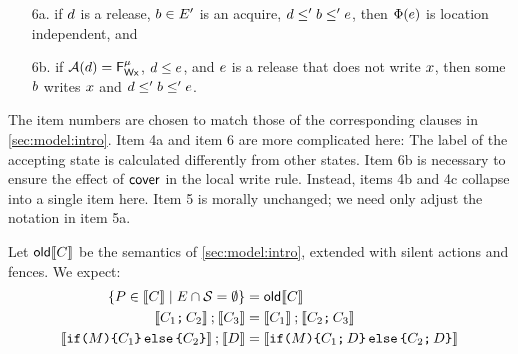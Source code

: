 \begin{definition}
\begin{enumerate}
\item[6a.] if $\bEv$ is a release, $\dEv\in\Event'$ is an acquire,
  $\bEv\le'\dEv\le'\aEv$, then $\labelingForm(\aEv)$ is location independent, and
\item[6b.] if $\labelingAct(\bEv)=\DFW[\aLoc]{\amode}$, $\bEv\le\aEv$, and
  $\aEv$ is a release that does not write $\aLoc$, then  some
  $\dEv$ writes $\aLoc$ and $\bEv\le'\dEv\le'\aEv$. %
\end{enumerate}
\end{definition}

The item numbers are chosen to match those of the corresponding clauses in
\textsection\ref{sec:model:intro}.  Item 4a and item 6 are more complicated
here: The label of the accepting state is calculated differently from other
states. Item 6b is necessary to ensure the effect of $\relfilt{}$ in the
local write rule.  Instead, items 4b and 4c collapse into a single item here.
Item 5 is morally unchanged; we need only adjust the notation in item 5a.

Let $\semold{\aCmd}$ be the semantics of \textsection\ref{sec:model:intro},
extended with silent actions and fences.  We expect:
\begin{align*}
  \{ \aPS\in\sem{\aCmd} \mid \disjoint{\Event}{\Sub}\} &= \semold{\aCmd}
  \\
  \sem{\aCmd_1\SEMI\aCmd_2}\sequence\sem{\aCmd_3} &= \sem{\aCmd_1}\sequence\sem{\aCmd_2\SEMI\aCmd_3}
  \\
  \sem{\IF{\aExp} \THEN \aCmd_1 \ELSE \aCmd_2\FI}\sequence\sem{\bCmd} &= 
  \sem{\IF{\aExp} \THEN \aCmd_1 \SEMI\bCmd\ELSE \aCmd_2\SEMI\bCmd\FI}
\end{align*}

\begin{comment}
Plan: 
  a.  Define pom1; pom2  for pomsets
  b.  [| C1 ; C2 |] = cup { pom1; pom2 | pom1 in C1, pom2 in C2}

Def:
   pom1; pom2
             cup_L  L prefix pom2 
             where L is a  linearization of pom1
\end{comment}

